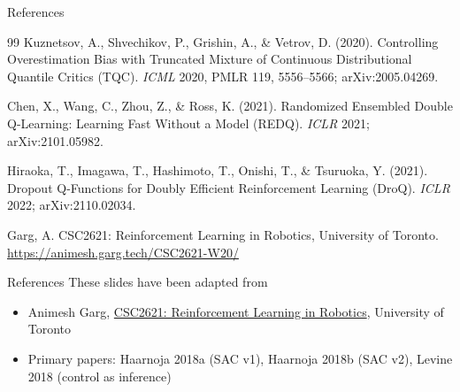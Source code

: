 \begin{frame}[allowframebreaks]{References}
\begin{thebibliography}{99}
\hypertarget{ref:9}{}
Kuznetsov, A., Shvechikov, P., Grishin, A., \& Vetrov, D. (2020).
\newblock Controlling Overestimation Bias with Truncated Mixture of Continuous Distributional Quantile Critics (TQC).
\newblock \emph{ICML} 2020, PMLR 119, 5556--5566; arXiv:2005.04269.

\hypertarget{ref:10}{}
Chen, X., Wang, C., Zhou, Z., \& Ross, K. (2021).
\newblock Randomized Ensembled Double Q-Learning: Learning Fast Without a Model (REDQ).
\newblock \emph{ICLR} 2021; arXiv:2101.05982.

\hypertarget{ref:11}{}
Hiraoka, T., Imagawa, T., Hashimoto, T., Onishi, T., \& Tsuruoka, Y. (2021).
\newblock Dropout Q-Functions for Doubly Efficient Reinforcement Learning (DroQ).
\newblock \emph{ICLR} 2022; arXiv:2110.02034.

\hypertarget{ref:12}{}
Garg, A. CSC2621: Reinforcement Learning in Robotics, University of Toronto.
\newblock \url{https://animesh.garg.tech/CSC2621-W20/}

\end{thebibliography}
\end{frame}

\begin{frame}{References}
These slides have been adapted from
\begin{itemize}
    \item Animesh Garg, \href{https://animesh.garg.tech/CSC2621-W20/}{CSC2621: Reinforcement Learning in Robotics}, University of Toronto \textbf{}
    \item Primary papers: Haarnoja 2018a \textbf{} (SAC v1), Haarnoja 2018b \textbf{} (SAC v2), Levine 2018 \textbf{} (control as inference)
\end{itemize}
\end{frame}
